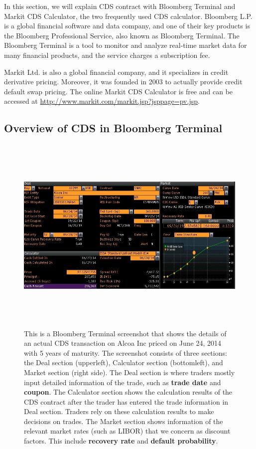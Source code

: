 \documentclass{jss}
\begin{document}
In this section, we will explain CDS contract with Bloomberg Terminal and Markit CDS Calculator, the two frequently used CDS calculator. Bloomberg L.P. is a global financial software and data company, and one of their key products is the Bloomberg Professional Service, also known as Bloomberg Terminal. The Bloomberg Terminal is a tool to monitor and analyze real-time market data for many financial products, and the service charges a subscription fee.

Markit Ltd. is also a global financial company, and it specializes in credit derivative pricing. Moreover, it was founded in 2003 to actually provide credit default swap pricing. The online Markit CDS Calculator is free and can be accessed at \url{http://www.markit.com/markit.jsp?jsppage=pv.jsp}.

\subsection{Overview  of CDS in Bloomberg Terminal}
\label{subsec:Bloomberg}

\begin{figure}[H]
\centering
\includegraphics[width=6.3in, height=3.8in]{images/AlcoaIncCDS.jpg}
\caption{This is a Bloomberg Terminal screenshot that shows the details of an actual CDS transaction on Alcoa Inc priced on June 24, 2014 with 5 years of maturity. The screenshot consists of three sections: the Deal section (upperleft), Calculator section (bottomleft), and Market section (right side). The Deal section is where traders mostly input detailed information of the trade, such as \textbf{trade date} and \textbf{coupon}. The Calculator section shows the calculation results of the CDS contract after the trader has entered the trade information in Deal section. Traders rely on these calculation results to make decisions on trades. The Market section shows information of the relevant market rates (such as LIBOR) that we concern as discount factors. This include \textbf{recovery rate} and \textbf{default probability}.}
\label{AlcoaIncCDS}
\end{figure}
\end{document}
